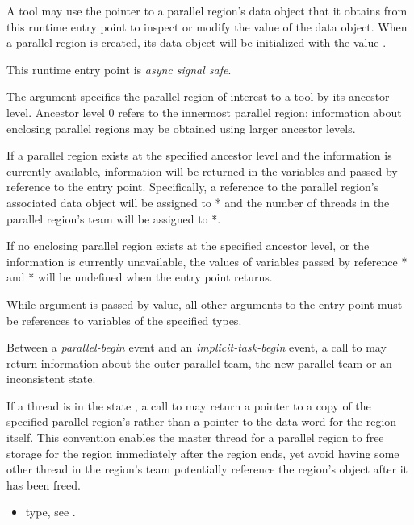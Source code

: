A tool may use the pointer to a parallel region's data object that it
obtains from this runtime entry point to inspect or modify the value
of the data object.  When a parallel region is created, its data
object will be initialized with the value .

This runtime entry point is \emph{async signal safe}.

\argdesc

The argument  specifies the parallel region
of interest to a tool by its ancestor level.  Ancestor level 0 refers
to the innermost parallel region; information about enclosing parallel
regions may be obtained using larger ancestor levels.

If a parallel region exists at the specified ancestor level
and the information is currently available,
information will be returned in the variables  and
 passed by reference to the entry point.
Specifically, a reference to the parallel region's associated data
object will be assigned to * and the number of
threads in the parallel region's team will be assigned to
*.

If no enclosing parallel region exists at the specified ancestor
level, or the information is currently unavailable,
the values of variables passed by reference
* and * will be undefined when the
entry point returns.

\constraints
While argument  is passed by
value, all other arguments to the entry point must be references
to variables of the specified types.


\restrictions
Between a \emph{parallel-begin} event and an \emph{implicit-task-begin}
event, a call to  may return
information about the outer parallel team, the new parallel team or an
inconsistent state.

If a thread is in the state ,
a call to 
may return a pointer to a copy of the specified parallel region's 
rather than a pointer to the data word for the region itself. This convention enables the master thread
for a parallel region to free storage for the region immediately after the region ends, yet
avoid having some other thread in the region's team
potentially reference the region's  object after it has been freed.

\crossreferences
\begin{itemize}
\item {} type, see .
\end{itemize}

